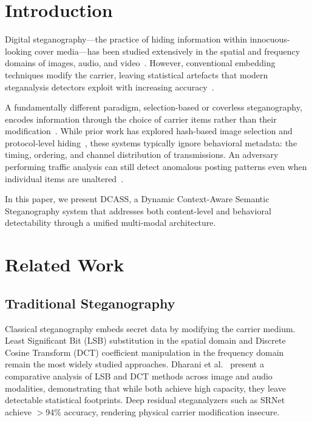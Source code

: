 \documentclass[conference]{IEEEtran}
\begin{document}
\section{Introduction}

Digital steganography---the practice of hiding information within innocuous-looking cover media---has been studied extensively in the spatial and frequency domains of images, audio, and video~\cite{provos2003hide}. However, conventional embedding techniques modify the carrier, leaving statistical artefacts that modern steganalysis detectors exploit with increasing accuracy~\cite{boroumand2018deep,zhang2019run,ye2017deep}.

A fundamentally different paradigm, selection-based or coverless steganography, encodes information through the choice of carrier items rather than their modification~\cite{zhou2019coverless}. While prior work has explored hash-based image selection and protocol-level hiding~\cite{szczypiorski2011rsteg}, these systems typically ignore behavioral metadata: the timing, ordering, and channel distribution of transmissions. An adversary performing traffic analysis can still detect anomalous posting patterns even when individual items are unaltered~\cite{cabuk2004ip}.

In this paper, we present DCASS, a Dynamic Context-Aware Semantic Steganography system that addresses both content-level and behavioral detectability through a unified multi-modal architecture.

\section{Related Work}

\subsection{Traditional Steganography}

Classical steganography embeds secret data by modifying the carrier medium. Least Significant Bit (LSB) substitution in the spatial domain and Discrete Cosine Transform (DCT) coefficient manipulation in the frequency domain remain the most widely studied approaches. Dharani et al.~\cite{dharani2021comparative} present a comparative analysis of LSB and DCT methods across image and audio modalities, demonstrating that while both achieve high capacity, they leave detectable statistical footprints. Deep residual steganalyzers such as SRNet~\cite{boroumand2018deep} achieve $>$94\% accuracy, rendering physical carrier modification insecure.
\end{document}
